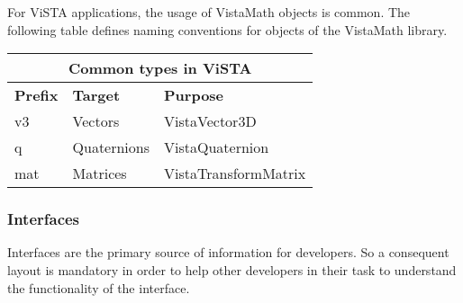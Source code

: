 For ViSTA applications, the usage of VistaMath objects is common.
The following table defines naming conventions for objects of the VistaMath library.

\begin{tabular}{|l|l|p{10cm}|}
\multicolumn{3}{c}{\textbf{Common types in ViSTA}}\\\hline
\textbf{Prefix} & \textbf{Target} & \textbf{Purpose} \\\hline
v3  & Vectors &  VistaVector3D\\\hline
q  & Quaternions & VistaQuaternion \\\hline
mat   & Matrices & VistaTransformMatrix\\\hline
\end{tabular}


\subsubsection{Interfaces}\label{sec:ClassCoding}
Interfaces are the primary source of information for developers.
So a consequent layout is mandatory in order to help other developers in their task to understand the functionality of the interface.

